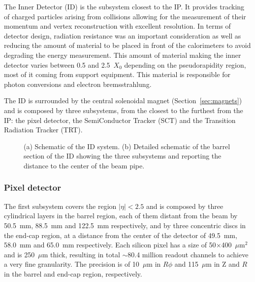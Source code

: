 The Inner Detector (ID) is the subsystem closest to the IP. 
It provides tracking of charged particles arising from collisions 
allowing for 
the measurement of their momentum and vertex reconstruction 
with excellent resolution. In terms of detector design,
radiation resistance was an important consideration
as well as reducing the amount of material to be placed 
in front of the calorimeters to avoid degrading the energy measurement.
This amount of material making the inner detector
varies between 0.5 and 2.5~$X_0$ 
depending on the pseudorapidity region, most of it coming from 
support equipment. This material
is responsible for photon conversions and electron bremsstrahlung.

The ID is surrounded by the central solenoidal magnet (Section~\ref{sec:magnets}) and is composed by three subsystems, 
from the closest to the furthest from the IP: the pixel detector, the SemiConductor Tracker (SCT) and
the Transition Radiation Tracker (TRT).

\begin{figure}[tb]\begin{center}
	\caption{(a) Schematic of the ID system. (b) Detailed schematic of the barrel section of the ID showing the
        three subsystems and reporting the distance to the center of the beam pipe.}
\end{center}\end{figure}


\subsubsection{Pixel detector}

The first subsystem covers the region $|\eta|<2.5$ and  is composed by three cylindrical layers in the barrel region, each of them distant from the beam by
50.5~mm, 88.5~mm and 122.5~mm respectively, and by three concentric discs in the 
end-cap region, at a  distance from the center of the detector of
49.5~mm, 58.0~mm and 65.0~mm respectively.
Each silicon pixel has a size of 50$\times$400~$\mu$m$^{2}$ and is 250~$\mu$m thick, 
resulting in total $\sim$80.4 million readout channels to achieve a very fine granularity.
The precision is of 10~$\mu$m in $R\phi$ and 115~$\mu$m in Z and $R$ in the barrel and end-cap
region, respectively.

